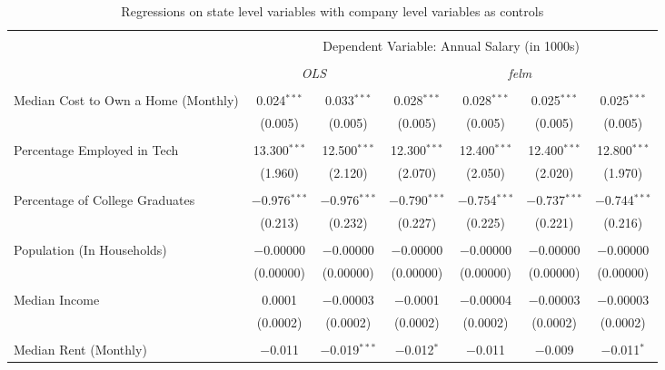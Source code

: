
\begin{table}[!htbp] \centering 
  \caption{Regressions on state level variables with company 
          level variables as controls} 
  \label{} 
\footnotesize 
\begin{tabular}{@{\extracolsep{5pt}}lcccccc} 
\\[-1.8ex]\hline 
\hline \\[-1.8ex] 
 & \multicolumn{6}{c}{Dependent Variable: Annual Salary (in 1000s)} \\ 
\cline{2-7} 
\\[-1.8ex] & \multicolumn{2}{c}{\textit{OLS}} & \multicolumn{4}{c}{\textit{felm}} \\ 
\hline \\[-1.8ex] 
 Median Cost to Own a Home (Monthly) & 0.024$^{***}$ & 0.033$^{***}$ & 0.028$^{***}$ & 0.028$^{***}$ & 0.025$^{***}$ & 0.025$^{***}$ \\ 
  & (0.005) & (0.005) & (0.005) & (0.005) & (0.005) & (0.005) \\ 
  & & & & & & \\ 
 Percentage Employed in Tech & 13.300$^{***}$ & 12.500$^{***}$ & 12.300$^{***}$ & 12.400$^{***}$ & 12.400$^{***}$ & 12.800$^{***}$ \\ 
  & (1.960) & (2.120) & (2.070) & (2.050) & (2.020) & (1.970) \\ 
  & & & & & & \\ 
 Percentage of College Graduates & $-$0.976$^{***}$ & $-$0.976$^{***}$ & $-$0.790$^{***}$ & $-$0.754$^{***}$ & $-$0.737$^{***}$ & $-$0.744$^{***}$ \\ 
  & (0.213) & (0.232) & (0.227) & (0.225) & (0.221) & (0.216) \\ 
  & & & & & & \\ 
 Population (In Households) & $-$0.00000 & $-$0.00000 & $-$0.00000 & $-$0.00000 & $-$0.00000 & $-$0.00000 \\ 
  & (0.00000) & (0.00000) & (0.00000) & (0.00000) & (0.00000) & (0.00000) \\ 
  & & & & & & \\ 
 Median Income & 0.0001 & $-$0.00003 & $-$0.0001 & $-$0.00004 & $-$0.00003 & $-$0.00003 \\ 
  & (0.0002) & (0.0002) & (0.0002) & (0.0002) & (0.0002) & (0.0002) \\ 
  & & & & & & \\ 
 Median Rent (Monthly) & $-$0.011 & $-$0.019$^{***}$ & $-$0.012$^{*}$ & $-$0.011 & $-$0.009 & $-$0.011$^{*}$ \\ 

\end{tabular}
\end{table}
